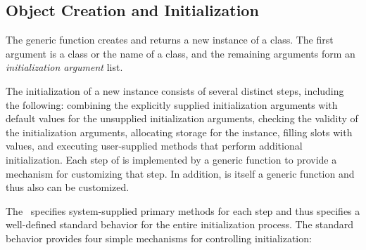 \subsection{Object Creation and Initialization}
\label{Object-Creation-and-Initialization-SECTION}

The generic function  creates and returns a new
instance of a class.  The first argument is a class or the name of a
class, and the remaining arguments form an \emph{initialization argument\/}
list.  

The initialization of a new instance consists of several distinct
steps, including the following: combining the explicitly supplied
initialization arguments with default values for the unsupplied
initialization arguments, checking the validity of the initialization
arguments, allocating storage for the instance, filling slots with
values, and executing user-supplied methods that perform additional
initialization.  Each step of  is implemented by a
generic function to provide a mechanism for customizing that step.  In
addition,  is itself a generic function and thus
also can be customized.

The \OS\ specifies system-supplied primary methods for each step and
thus specifies a well-defined standard behavior for the entire
initialization process.  The standard behavior provides four simple
mechanisms for controlling initialization:

